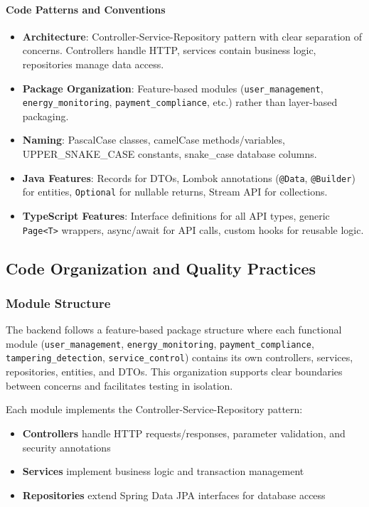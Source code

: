 \paragraph{Code Patterns and Conventions}
\begin{itemize}
    \item \textbf{Architecture}: Controller-Service-Repository pattern with clear separation of concerns. Controllers handle HTTP, services contain business logic, repositories manage data access.
    \item \textbf{Package Organization}: Feature-based modules (\texttt{user\_management}, \texttt{energy\_monitoring}, \texttt{payment\_compliance}, etc.) rather than layer-based packaging.
    \item \textbf{Naming}: PascalCase classes, camelCase methods/variables, UPPER\_SNAKE\_CASE constants, snake\_case database columns.
    \item \textbf{Java Features}: Records for DTOs, Lombok annotations (\texttt{@Data}, \texttt{@Builder}) for entities, \texttt{Optional} for nullable returns, Stream API for collections.
    \item \textbf{TypeScript Features}: Interface definitions for all API types, generic \texttt{Page<T>} wrappers, async/await for API calls, custom hooks for reusable logic.
\end{itemize}

\subsection{Code Organization and Quality Practices}
\label{subsec:code-quality}

\subsubsection{Module Structure}
\label{subsubsec:code-structure}

The backend follows a feature-based package structure where each functional module (\texttt{user\_management}, \texttt{energy\_monitoring}, \texttt{payment\_compliance}, \texttt{tampering\_detection}, \texttt{service\_control}) contains its own controllers, services, repositories, entities, and DTOs. This organization supports clear boundaries between concerns and facilitates testing in isolation.

Each module implements the Controller-Service-Repository pattern:
\begin{itemize}
    \item \textbf{Controllers} handle HTTP requests/responses, parameter validation, and security annotations
    \item \textbf{Services} implement business logic and transaction management
    \item \textbf{Repositories} extend Spring Data JPA interfaces for database access
\end{itemize}


